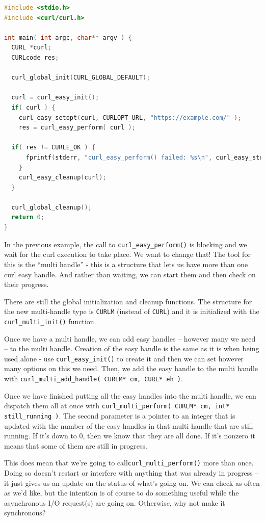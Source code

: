 \begin{lstlisting}[language=C]
#include <stdio.h>
#include <curl/curl.h>
 
int main( int argc, char** argv ) {
  CURL *curl;
  CURLcode res;
 
  curl_global_init(CURL_GLOBAL_DEFAULT);
 
  curl = curl_easy_init();
  if( curl ) {
    curl_easy_setopt(curl, CURLOPT_URL, "https://example.com/" );
    res = curl_easy_perform( curl );
    
  if( res != CURLE_OK ) {
      fprintf(stderr, "curl_easy_perform() failed: %s\n", curl_easy_strerror(res));
    }
    curl_easy_cleanup(curl);
  }
 
  curl_global_cleanup();
  return 0;
}
\end{lstlisting}

In the previous example, the call to \texttt{curl\_easy\_perform()} is blocking and we wait for the curl execution to take place. We want to change that! The tool for this is the ``multi handle'' - this is a structure that lets us have more than one curl easy handle. And rather than waiting, we can start them and then check on their progress. 

There are still the global initialization and cleanup functions. The structure for the new multi-handle type is \texttt{CURLM} (instead of \texttt{CURL}) and it is initialized with the \texttt{curl\_multi\_init()} function. 

Once we have a multi handle, we can add easy handles -- however many we need -- to the multi handle. Creation of the easy handle is the same as it is when being used alone - use \texttt{curl\_easy\_init()} to create it and then we can set however many options on this we need. Then, we add the easy handle to the multi handle with \texttt{curl\_multi\_add\_handle( CURLM* cm, CURL* eh )}.

Once we have finished putting all the easy handles into the multi handle, we can dispatch them all at once with \texttt{curl\_multi\_perform( CURLM* cm, int* still\_running )}. The second parameter is a pointer to an integer that is updated with the number of the easy handles in that multi handle that are still running. If it's down to 0, then we know that they are all done. If it's nonzero it means that some of them are still in progress.

This does mean that we're going to call\texttt{curl\_multi\_perform()} more than once. Doing so doesn't restart or interfere with anything that was already in progress -- it just gives us an update on the status of what's going on. We can check as often as we'd like, but the intention is of course to do something useful while the asynchronous I/O request(s) are going on. Otherwise, why not make it synchronous?


